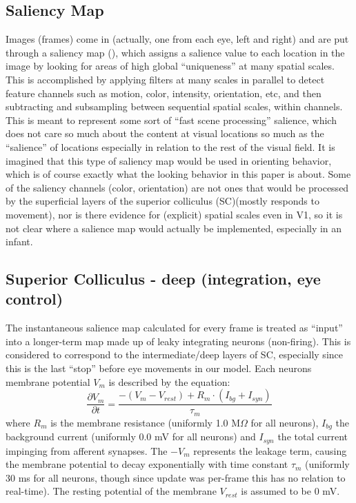 \documentclass[12pt]{article}
\begin{document}
\subsection{Saliency Map}
Images (frames) come in (actually, one from each eye, left and right)
and are put through a saliency map (\cite{itti_etal_1998}), which
assigns a salience value to each location in the image by looking for
areas of high global ``uniqueness'' at many spatial scales. This is
accomplished by applying filters at many scales in parallel to detect
feature channels such as motion, color, intensity, orientation, etc,
and then subtracting and subsampling between sequential spatial
scales, within channels. This is meant to represent some sort of
``fast scene processing'' salience, which does not care so much about
the content at visual locations so much as the ``salience'' of
locations especially in relation to the rest of the visual field. It
is imagined that this type of saliency map would be used in orienting
behavior, which is of course exactly what the looking behavior in this
paper is about. Some of the saliency channels (color, orientation) are
not ones that would be processed by the superficial layers of the
superior colliculus (SC)(mostly responds to movement), nor is there
evidence for (explicit) spatial scales even in V1, so it is not clear
where a salience map would actually be implemented, especially in an
infant.

\subsection{Superior Colliculus - deep (integration, eye control)}
The instantaneous salience map calculated for every frame is treated
as ``input'' into a longer-term map made up of leaky integrating
neurons (non-firing). This is considered to correspond to the
intermediate/deep layers of SC, especially since this is the last
``stop'' before eye movements in our model. Each neurons membrane
potential $V_m$ is described by the equation:
\begin{equation}
\frac{\partial V_m}{\partial t} = \frac{-(V_m - V_{rest}) + R_m \cdot
  (I_{bg} + I_{syn})}{\tau_m}
\end{equation}
where $R_m$ is the membrane resistance (uniformly 1.0 M$\Omega$ for
all neurons), $I_{bg}$ the background current (uniformly 0.0 mV for
all neurons) and $I_{syn}$ the total current impinging from afferent
synapses. The $-V_m$ represents the leakage term, causing the membrane
potential to decay exponentially with time constant $\tau_m$
(uniformly 30 ms for all neurons, though since update was per-frame
this has no relation to real-time). The resting potential of the
membrane $V_{rest}$ is assumed to be 0 mV.
\end{document}
